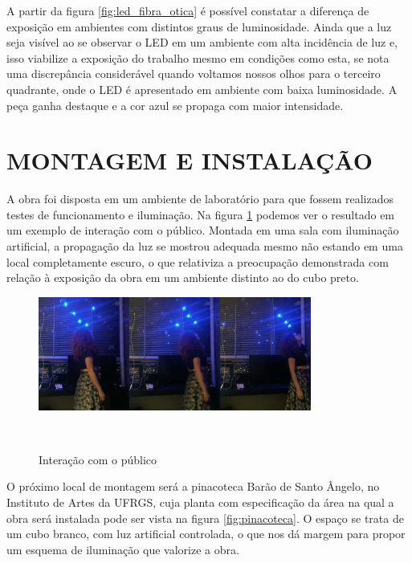 A partir da figura \ref{fig:led_fibra_otica} é possível constatar a diferença de exposição em ambientes com distintos graus de luminosidade. Ainda que a luz seja visível ao se observar o LED em um ambiente com alta incidência de luz e, isso viabilize a exposição do trabalho mesmo em condições como esta, se nota uma discrepância considerável quando voltamos nossos olhos para o terceiro quadrante, onde o LED é apresentado em ambiente com baixa luminosidade. A peça ganha destaque e a cor azul se propaga com maior intensidade.

\section{MONTAGEM E INSTALAÇÃO}

A obra foi disposta em um ambiente de laboratório para que fossem realizados testes de funcionamento e iluminação. Na figura \ref{fig:trabalho} podemos ver o resultado em um exemplo de interação com o público. Montada em uma sala com iluminação artificial, a propagação da luz se mostrou adequada mesmo não estando em uma local completamente escuro, o que relativiza a preocupação demonstrada com relação à exposição da obra em um ambiente distinto ao do cubo preto.  
   
\begin{figure}[H]
  \begin{center}
    \caption{Interação com o público}
    \vspace*{0,2cm}
    \includegraphics[width=0.8\textwidth]{./04-figuras/trabalho}
    \label{fig:trabalho}
  \end{center}
  \vspace*{-0,9cm}
  \\
\end{figure}

O próximo local de montagem será a pinacoteca Barão de Santo Ângelo, no Instituto de Artes da UFRGS, cuja planta com especificação da área na qual a obra será instalada pode ser vista na figura \ref{fig:pinacoteca}. O espaço se trata de um cubo branco, com luz artificial controlada, o que nos dá margem para propor um esquema de iluminação que valorize a obra.

